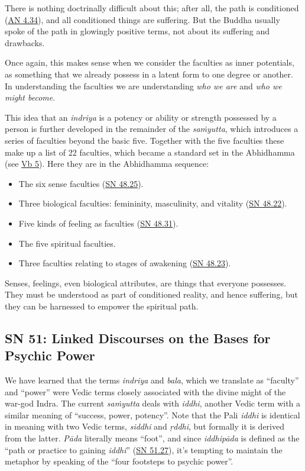 \documentclass[12pt,openany]{book}%
\begin{document}
There is nothing doctrinally difficult about this; after all, the path is conditioned (\href{https://suttacentral.net/an4.34}{AN 4.34}), and all conditioned things are suffering. But the Buddha usually spoke of the path in glowingly positive terms, not about its suffering and drawbacks.

Once again, this makes sense when we consider the faculties as inner potentials, as something that we already possess in a latent form to one degree or another. In understanding the faculties we are understanding \emph{who we are} and \emph{who we might become}.

This idea that an \textit{indriya} is a potency or ability or strength possessed by a person is further developed in the remainder of the \textit{\textsanskrit{saṁyutta}}, which introduces a series of faculties beyond the basic five. Together with the five faculties these make up a list of 22 faculties, which became a standard set in the Abhidhamma (see \href{https://suttacentral.net/vb5}{Vb 5}). Here they are in the Abhidhamma sequence:

\begin{itemize}%
\item The six sense faculties (\href{https://suttacentral.net/sn48.25}{SN 48.25}).%
\item Three biological faculties: femininity, masculinity, and vitality (\href{https://suttacentral.net/sn48.22}{SN 48.22}).%
\item Five kinds of feeling as faculties (\href{https://suttacentral.net/sn48.31}{SN 48.31}).%
\item The five spiritual faculties.%
\item Three faculties relating to stages of awakening (\href{https://suttacentral.net/sn48.23}{SN 48.23}).%
\end{itemize}

Senses, feelings, even biological attributes, are things that everyone possesses. They must be understood as part of conditioned reality, and hence suffering, but they can be harnessed to empower the spiritual path.

\subsection*{SN 51: Linked Discourses on the Bases for Psychic Power}

We have learned that the terms \textit{indriya} and \textit{bala}, which we translate as “faculty” and “power” were Vedic terms closely associated with the divine might of the war-god Indra. The current \textit{\textsanskrit{saṁyutta}} deals with \textit{iddhi}, another Vedic term with a similar meaning of “success, power, potency”. Note that the Pali \textit{iddhi} is identical in meaning with two Vedic terms, \textit{siddhi} and \textit{\textsanskrit{ṛddhi}}, but formally it is derived from the latter. \textit{\textsanskrit{Pāda}} literally means “foot”, and since \textit{\textsanskrit{iddhipāda}} is defined as the “path or practice to gaining \textit{iddhi}” (\href{https://suttacentral.net/sn51.27}{SN 51.27}), it’s tempting to maintain the metaphor by speaking of the “four footsteps to psychic power”.
\end{document}
